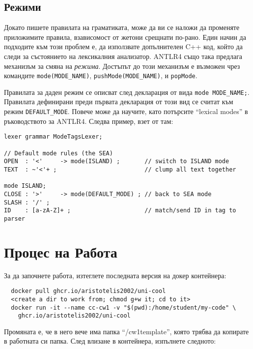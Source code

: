 \documentclass[11pt]{article}
\makeatletter
\newcommand{\verbatimfont}[1]{\def\verbatim@font{#1}}%
\makeatother
\begin{document}
\subsection{Режими}

Докато пишете правилата на граматиката, може да ви се наложи да променяте приложимите правила, взависомост от жетони срещнати по-рано.
Един начин да подходите към този проблем е, да използвате допълнителен C++ код, който да следи за състоянието на лексикалния анализатор.
ANTLR4 също така предлага механизъм за смяна на \emph{режима}.
Достъпът до този механизъм е възможен чрез командите \texttt{mode(MODE\_NAME)}, \texttt{pushMode(MODE\_NAME)}, и \texttt{popMode}.

Правилата за даден режим се описват след декларация от вида \texttt{mode MODE\_NAME;}.
Правилата дефинирани преди първата декларация от този вид се считат към режим \texttt{DEFAULT\_MODE}.
Повече може да научите, като потърсите ``lexical modes'' в ръководството за ANTLR4.
Следва пример, взет от там:

\begin{verbatim}
lexer grammar ModeTagsLexer;

// Default mode rules (the SEA)
OPEN  : '<'     -> mode(ISLAND) ;       // switch to ISLAND mode
TEXT  : ~'<'+ ;                         // clump all text together

mode ISLAND;
CLOSE : '>'     -> mode(DEFAULT_MODE) ; // back to SEA mode
SLASH : '/' ;
ID    : [a-zA-Z]+ ;                     // match/send ID in tag to parser
\end{verbatim}

\section{Процес на Работа}\label{sec:process}

За да започнете работа, изтеглете последната версия на докер контейнера:

\verbatimfont{\ttfamily}
\begin{verbatim}
  docker pull ghcr.io/aristotelis2002/uni-cool
  <create a dir to work from; chmod g+w it; cd to it>
  docker run -it --name cc-cw1 -v "$(pwd):/home/student/my-code" \
    ghcr.io/aristotelis2002/uni-cool
\end{verbatim}

\noindent Промяната е, че в него вече има папка ``/cw1template'', която трябва да копирате в работната си папка.
След влизане в контейнера, изпълнете следното:
\end{document}
